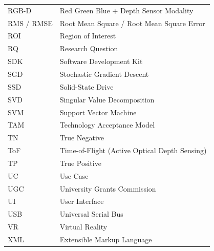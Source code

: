 {\begin{longtable}{@{}p{3.0cm} p{12.0cm}@{}}
RGB-D & Red Green Blue + Depth Sensor Modality \\
RMS / RMSE & Root Mean Square / Root Mean Square Error \\
ROI & Region of Interest \\
RQ & Research Question \\
SDK & Software Development Kit \\
SGD & Stochastic Gradient Descent \\
SSD & Solid-State Drive \\
SVD & Singular Value Decomposition \\
SVM & Support Vector Machine \\
TAM & Technology Acceptance Model \\
TN & True Negative \\
ToF & Time-of-Flight (Active Optical Depth Sensing) \\
TP & True Positive \\
UC & Use Case \\
UGC & University Grants Commission \\
UI & User Interface \\
USB & Universal Serial Bus \\
VR & Virtual Reality \\
XML & Extensible Markup Language \\
\end{longtable}
}
